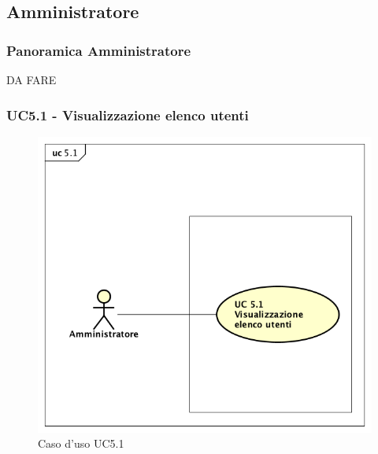 \subsection{Amministratore}
\subsubsection{Panoramica Amministratore}
DA FARE


\subsubsection{UC5.1 - Visualizzazione elenco utenti}

\begin{figure}[H]
\centering
\includegraphics[width=17cm]{img/UC51.png} 
\caption{Caso d'uso UC5.1}
\end{figure}


